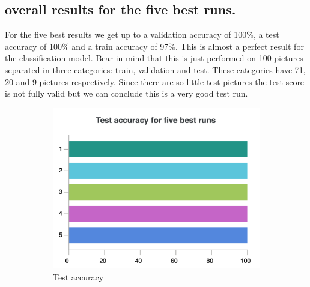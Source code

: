 \subsection{overall results for the five best runs.}


	For the five best results we get up to a validation accuracy of 100\%, a test accuracy of 100\% and a train accuracy of 97\%. This is almost a perfect result for the classification model. Bear in mind that this is just performed on 100 pictures separated in three categories: train, validation and test. These categories have 71, 20 and 9 pictures respectively. Since there are so little test pictures the test score is not fully valid but we can conclude this is a very good test run.

	\begin{figure}[hbtp]
		\begin{subfigure}{0.31\textwidth}
			\centering
			\includegraphics[width=\linewidth]{fig/results/wandb/second_handmade_sweep/charts/Section-2-Panel-0-jm7rxjojx.png}
			\caption{Test accuracy}
		\end{subfigure}
		\hspace*{\fill}   %
		\begin{subfigure}{0.31\textwidth}
			\centering

\end{subfigure}
\end{figure}
